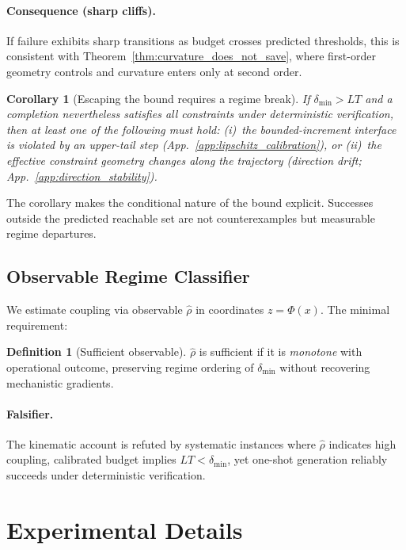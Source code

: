 \documentclass{article}
\theoremstyle{plain}
\newtheorem{corollary}[theorem]{Corollary}
\theoremstyle{definition}
\newtheorem{definition}[theorem]{Definition}
\theoremstyle{remark}
\newcommand{\appref}[1]{App.~\ref{#1}}
\begin{document}
\paragraph{Consequence (sharp cliffs).}
If failure exhibits sharp transitions as budget crosses predicted thresholds, this is consistent with Theorem~\ref{thm:curvature_does_not_save}, where first-order geometry controls and curvature enters only at second order.

\begin{corollary}[Escaping the bound requires a regime break]\label{cor:regime_break}
If $\delta_{\min} > LT$ and a completion nevertheless satisfies all constraints under deterministic verification, then at least one of the following must hold: (i)~the bounded-increment interface is violated by an upper-tail step (\appref{app:lipschitz_calibration}), or (ii)~the effective constraint geometry changes along the trajectory (direction drift; \appref{app:direction_stability}).
\end{corollary}

The corollary makes the conditional nature of the bound explicit. Successes outside the predicted reachable set are not counterexamples but measurable regime departures.

\subsection{Observable Regime Classifier}
We estimate coupling via observable $\hat\rho$ in coordinates $z=\Phi(x)$. The minimal requirement:

\begin{definition}[Sufficient observable]
\label{def:sufficient_observable}
$\hat\rho$ is sufficient if it is \emph{monotone} with operational outcome, preserving regime ordering of $\delta_{\min}$ without recovering mechanistic gradients.
\end{definition}

\paragraph{Falsifier.}
The kinematic account is refuted by systematic instances where $\hat\rho$ indicates high coupling, calibrated budget implies $LT<\delta_{\min}$, yet one-shot generation reliably succeeds under deterministic verification.

\section{Experimental Details}\label{app:experiments}
\end{document}
